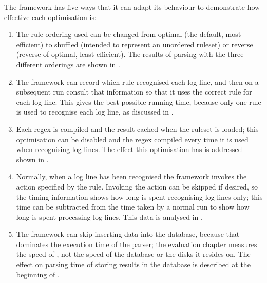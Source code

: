 The framework has five ways that it can adapt its behaviour to demonstrate
how effective each optimisation is:

\begin{enumerate}

    \item The rule ordering used can be changed from optimal (the default,
        most efficient) to shuffled (intended to represent an unordered
        ruleset) or reverse (reverse of optimal, least efficient).  The
        results of parsing with the three different orderings are shown in
        .

    \item The framework can record which rule recognised each log line, and
        then on a subsequent run consult that information so that it uses
        the correct rule for each log line.  This gives the best possible
        running time, because only one rule is used to recognise each log
        line, as discussed in .

    \item Each regex is compiled and the result cached when the ruleset is
        loaded; this optimisation can be disabled and the regex compiled
        every time it is used when recognising log lines.  The effect this
        optimisation has is addressed shown in .

    \item Normally, when a log line has been recognised the framework
        invokes the action specified by the rule.  Invoking the action can
        be skipped if desired, so the timing information shows how long is
        spent recognising log lines only; this time can be subtracted from
        the time taken by a normal run to show how long is spent processing
        log lines.  This data is analysed in .

    \item The framework can skip inserting data into the database, because
        that dominates the execution time of the parser; the evaluation
        chapter measures the speed of \parsername{}, not the speed of the
        database or the disks it resides on.  The effect on parsing time of
        storing results in the database is described at the beginning of
        .

\end{enumerate}

